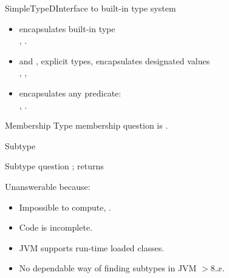 \begin{frame}{SimpleTypeD}{Interface to built-in type system}
  
  \begin{itemize}
  \item {} encapsulates built-in type \\
    \eg, .
  \item {} and , explicit types, encapsulates designated values\\
    \eg, , 
  \item {} encapsulates any predicate: \\
    \eg, .
  \end{itemize}
\end{frame}


\newsavebox\membershipbox
\begin{lrbox}{\membershipbox}
  \begin{minipage}{11cm}
    
  \end{minipage}
\end{lrbox}

\begin{frame}{ Membership}
  Type membership question is .

  \usebox\membershipbox
\end{frame}

\newsavebox\subtypebox
\begin{lrbox}{\subtypebox}
  \begin{minipage}{11cm}

  \end{minipage}
\end{lrbox}



\begin{frame}{ Subtype}

  Subtype question ;  returns 

  \usebox\subtypebox

  Unanswerable because:
  \begin{itemize}
  \item Impossible to compute, \eg {}.
  \item Code is incomplete.
  \item JVM supports run-time loaded classes.
  \item No dependable way of finding subtypes in JVM $> 8.x$.
  \end{itemize}

\end{frame}

